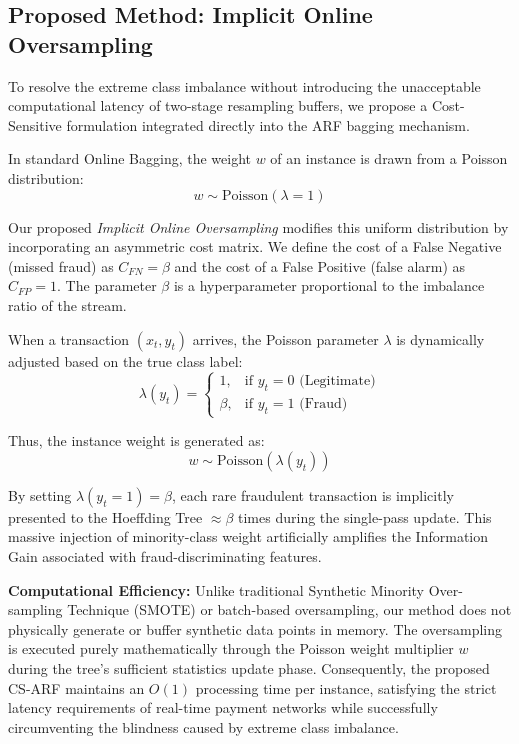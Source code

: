 \subsection{Proposed Method: Implicit Online Oversampling}
To resolve the extreme class imbalance without introducing the unacceptable computational latency of two-stage resampling buffers, we propose a Cost-Sensitive formulation integrated directly into the ARF bagging mechanism. 

In standard Online Bagging, the weight $w$ of an instance is drawn from a Poisson distribution:
\begin{equation}
    w \sim \text{Poisson}(\lambda=1)
\end{equation}

Our proposed \textit{Implicit Online Oversampling} modifies this uniform distribution by incorporating an asymmetric cost matrix. We define the cost of a False Negative (missed fraud) as $C_{FN} = \beta$ and the cost of a False Positive (false alarm) as $C_{FP} = 1$. The parameter $\beta$ is a hyperparameter proportional to the imbalance ratio of the stream.

When a transaction $(x_t, y_t)$ arrives, the Poisson parameter $\lambda$ is dynamically adjusted based on the true class label:
\begin{equation}
    \lambda(y_t) = 
    \begin{cases} 
      1, & \text{if } y_t = 0 \text{ (Legitimate)} \\
      \beta, & \text{if } y_t = 1 \text{ (Fraud)}
    \end{cases}
\end{equation}

Thus, the instance weight is generated as:
\begin{equation}
    w \sim \text{Poisson}(\lambda(y_t))
\end{equation}

By setting $\lambda(y_t=1) = \beta$, each rare fraudulent transaction is implicitly presented to the Hoeffding Tree $\approx \beta$ times during the single-pass update. This massive injection of minority-class weight artificially amplifies the Information Gain associated with fraud-discriminating features. 

\textbf{Computational Efficiency:} Unlike traditional Synthetic Minority Over-sampling Technique (SMOTE) or batch-based oversampling, our method does not physically generate or buffer synthetic data points in memory. The oversampling is executed purely mathematically through the Poisson weight multiplier $w$ during the tree's sufficient statistics update phase. Consequently, the proposed CS-ARF maintains an $O(1)$ processing time per instance, satisfying the strict latency requirements of real-time payment networks while successfully circumventing the blindness caused by extreme class imbalance.
